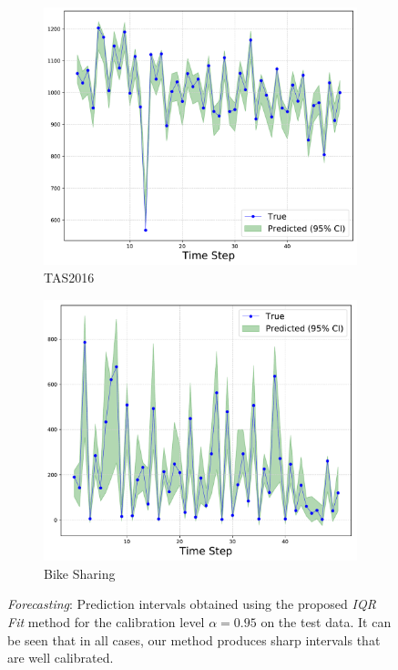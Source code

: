 \documentclass[letterpaper]{article} %
\begin{document}
\begin{figure}[t]
\begin{subfigure}[b]{0.235\textwidth}
    \end{subfigure}
    \begin{subfigure}[b]{0.24\textwidth}
	        \centering
			\includegraphics[width=\linewidth, keepaspectratio=true]{tas2016.pdf}
		\caption{TAS2016}
	    \label{fig:tas2016}		
    \end{subfigure}
    \begin{subfigure}[b]{0.24\textwidth}
	        \centering
			\includegraphics[width=\linewidth, keepaspectratio=true]{bike.pdf}
		\caption{Bike Sharing}
	    \label{fig:bike}		
    \end{subfigure}
\caption{\textit{Forecasting}: Prediction intervals obtained using the proposed \textit{IQR Fit} method for the calibration level $\alpha = 0.95$ on the test data. It can be seen that in all cases, our method produces sharp intervals that are well calibrated.}
\label{fig:ts}
\end{figure}
\end{document}
